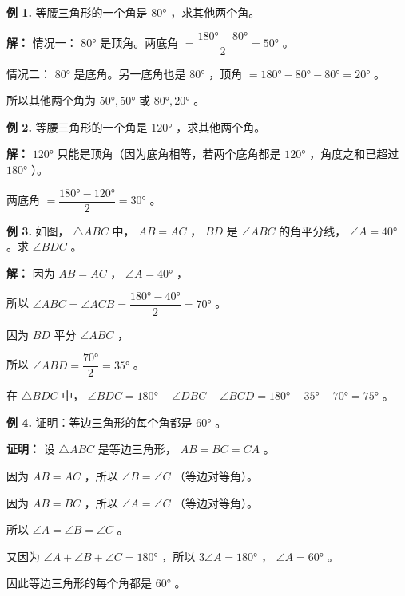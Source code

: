 \begin{workedexamples}


\textbf{例 1.} 等腰三角形的一个角是 $80°$ ，求其他两个角。

\textbf{解：}
情况一： $80°$ 是顶角。两底角 $= \dfrac{180° - 80°}{2} = 50°$ 。

情况二： $80°$ 是底角。另一底角也是 $80°$ ，顶角 $= 180° - 80° - 80° = 20°$ 。

所以其他两个角为 $50°, 50°$ 或 $80°, 20°$ 。

\textbf{例 2.} 等腰三角形的一个角是 $120°$ ，求其他两个角。

\textbf{解：}
$120°$ 只能是顶角（因为底角相等，若两个底角都是 $120°$ ，角度之和已超过 $180°$ ）。

两底角 $= \dfrac{180° - 120°}{2} = 30°$ 。

\textbf{例 3.} 如图， $\triangle ABC$ 中， $AB = AC$ ， $BD$ 是 $\angle ABC$ 的角平分线， $\angle A = 40°$ 。求 $\angle BDC$ 。

\begin{center}
\label{fig:isosceles-ex3}
\end{center}


\textbf{解：}
因为 $AB = AC$ ， $\angle A = 40°$ ，

所以 $\angle ABC = \angle ACB = \dfrac{180° - 40°}{2} = 70°$ 。

因为 $BD$ 平分 $\angle ABC$ ，

所以 $\angle ABD = \dfrac{70°}{2} = 35°$ 。

在 $\triangle BDC$ 中， $\angle BDC = 180° - \angle DBC - \angle BCD = 180° - 35° - 70° = 75°$ 。

\textbf{例 4.} 证明：等边三角形的每个角都是 $60°$ 。

\textbf{证明：}
设 $\triangle ABC$ 是等边三角形， $AB = BC = CA$ 。

因为 $AB = AC$ ，所以 $\angle B = \angle C$ （等边对等角）。

因为 $AB = BC$ ，所以 $\angle A = \angle C$ （等边对等角）。

所以 $\angle A = \angle B = \angle C$ 。

又因为 $\angle A + \angle B + \angle C = 180°$ ，所以 $3\angle A = 180°$ ， $\angle A = 60°$ 。

因此等边三角形的每个角都是 $60°$ 。

\end{workedexamples}


